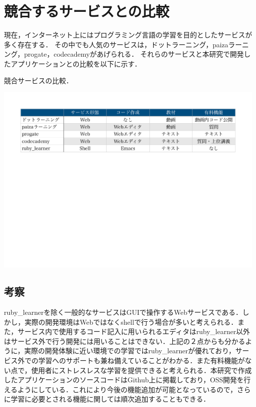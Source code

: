 \chapter{競合するサービスとの比較}\label{ux4ed6ux306eux30bdux30d5ux30c8ux3068ux306eux6bd4ux8f03}
現在，インターネット上にはプログラミング言語の学習を目的としたサービスが多く存在する．
その中でも人気のサービスは，ドットラーニング\cite{ドットラーニング}，paizaラーニング\cite{paiza}，progate，codecademyがあげられる．
それらのサービスと本研究で開発したアプリケーションとの比較を以下に示す．
\begin{table}[H]
\centering
\begin{center}
\caption{競合サービスの比較．\label{service_compare}}
\includegraphics[width=150mm]{../../picture/service_compare.pdf}
\end{center}
\label{fig:}
\end{table}

\section{考察}\label{ux8003ux5bdf}
ruby\_learnerを除く一般的なサービスはGUIで操作するWebサービスである．しかし，実際の開発環境はWebではなくshellで行う場合が多いと考えられる．また，サービス内で使用するコード記入に用いられるエディタはruby\_learner以外はサービス外で行う開発には用いることはできない．上記の２点からも分かるように，実際の開発体験に近い環境での学習ではruby\_learnerが優れており，サービス外での学習へのサポートも兼ね備えていることがわかる．また有料機能がない点で，使用者にストレスレスな学習を提供できると考えられる．本研究で作成したアプリケーションのソースコードはGithub上に掲載しており，OSS開発を行えるようにしている．これにより今後の機能追加が可能となっているので，さらに学習に必要とされる機能に関しては順次追加することもできる．
